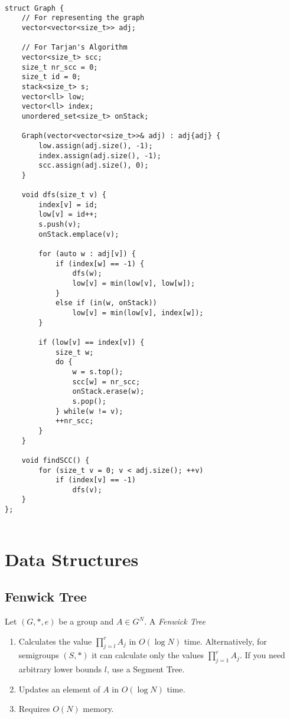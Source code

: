 \documentclass[11pt]{amsart}
\begin{document}
\begin{verbatim}

struct Graph {
    // For representing the graph
    vector<vector<size_t>> adj;

    // For Tarjan's Algorithm
    vector<size_t> scc;
    size_t nr_scc = 0;
    size_t id = 0;
    stack<size_t> s;
    vector<ll> low;
    vector<ll> index;
    unordered_set<size_t> onStack;    

    Graph(vector<vector<size_t>>& adj) : adj{adj} {
        low.assign(adj.size(), -1);
        index.assign(adj.size(), -1);
        scc.assign(adj.size(), 0);
    }

    void dfs(size_t v) {
        index[v] = id;
        low[v] = id++;
        s.push(v);
        onStack.emplace(v);

        for (auto w : adj[v]) {
            if (index[w] == -1) {
                dfs(w);
                low[v] = min(low[v], low[w]);
            }
            else if (in(w, onStack))
                low[v] = min(low[v], index[w]);
        }

        if (low[v] == index[v]) {
            size_t w;
            do {
                w = s.top();
                scc[w] = nr_scc;
                onStack.erase(w);
                s.pop();
            } while(w != v);
            ++nr_scc;
        }
    }

    void findSCC() {
        for (size_t v = 0; v < adj.size(); ++v)
            if (index[v] == -1)
                dfs(v);
    }
};
  
\end{verbatim}


\section{Data Structures}

\subsection{Fenwick Tree}

Let $(G,*,e)$ be a group and $A\in G^N$. A \textit{Fenwick Tree} 
\begin{enumerate}[label=(\roman*)]
  \item Calculates the value $\prod_{j=l}^r A_j$ in $O(\log N)$ time. Alternatively, for semigroups $(S,*)$ it can calculate only the values  $\prod_{j=1}^r A_j$. If you need arbitrary lower bounds $l$, use a Segment Tree.
  \item Updates an element of $A$ in $O(\log N)$ time.
  \item Requires $O(N)$ memory.
\end{enumerate} 
\end{document}
